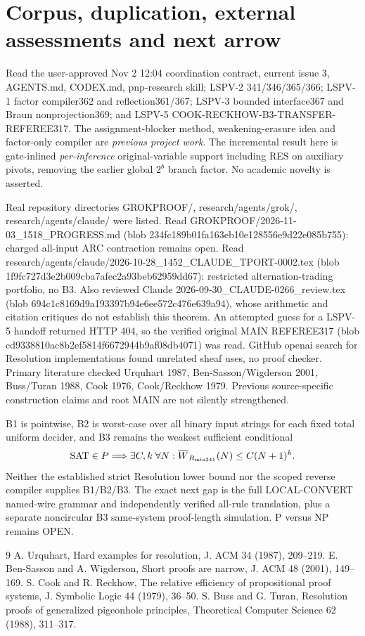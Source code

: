 \documentclass[11pt]{article}
\begin{document}
\section*{Corpus, duplication, external assessments and next arrow}
Read the user-approved Nov 2 12:04 coordination contract, current issue 3, AGENTS.md, CODEX.md, pnp-research skill; LSPV-2 341/346/365/366; LSPV-1 factor compiler362 and reflection361/367; LSPV-3 bounded interface367 and Braun nonprojection369; and LSPV-5 COOK-RECKHOW-B3-TRANSFER-REFEREE317. The assignment-blocker method, weakening-erasure idea and factor-only compiler are \emph{previous project work}. The incremental result here is gate-inlined \emph{per-inference} original-variable support including RES on auxiliary pivots, removing the earlier global $2^b$ branch factor. No academic novelty is asserted.

Real repository directories GROKPROOF/, research/agents/grok/, research/agents/claude/ were listed. Read GROKPROOF/2026-11-03_1518_PROGRESS.md (blob 234fc189b01fa163eb10e128556e9d22e085b755): charged all-input ARC contraction remains open. Read research/agents/claude/2026-10-28_1452_CLAUDE_TPORT-0002.tex (blob 1f9fc727d3e2b009cba7afec2a93beb62959dd67): restricted alternation-trading portfolio, no B3. Also reviewed Claude 2026-09-30_CLAUDE-0266_review.tex (blob 694c1c8169d9a193397b94e6ee572c476e639a94), whose arithmetic and citation critiques do not establish this theorem. An attempted guess for a LSPV-5 handoff returned HTTP 404, so the verified original MAIN REFEREE317 (blob cd9338810ac8b2ef5814f6672944b9af08db4071) was read. GitHub openai search for Resolution implementations found unrelated sheaf uses, no proof checker. Primary literature checked Urquhart 1987, Ben-Sasson/Wigderson 2001, Buss/Turan 1988, Cook 1976, Cook/Reckhow 1979. Previous source-specific construction claims and root MAIN are not silently strengthened.

B1 is pointwise, B2 is worst-case over all binary input strings for each fixed total uniform decider, and B3 remains the weakest sufficient conditional
\[
{\rm SAT}\in P\Longrightarrow\exists C,k\;\forall N:
\overline W_{R_{\mathrm{mix341}}}(N)\le C(N+1)^k.
\]
Neither the established strict Resolution lower bound nor the scoped reverse compiler supplies B1/B2/B3. The exact next gap is the full LOCAL-CONVERT named-wire grammar and independently verified all-rule translation, plus a separate noncircular B3 same-system proof-length simulation. P versus NP remains OPEN.
\begin{thebibliography}{9}
 A. Urquhart, Hard examples for resolution, J. ACM 34 (1987), 209--219.
 E. Ben-Sasson and A. Wigderson, Short proofs are narrow, J. ACM 48 (2001), 149--169.
 S. Cook and R. Reckhow, The relative efficiency of propositional proof systems, J. Symbolic Logic 44 (1979), 36--50.
 S. Buss and G. Turan, Resolution proofs of generalized pigeonhole principles, Theoretical Computer Science 62 (1988), 311--317.
\end{thebibliography}
\end{document}
